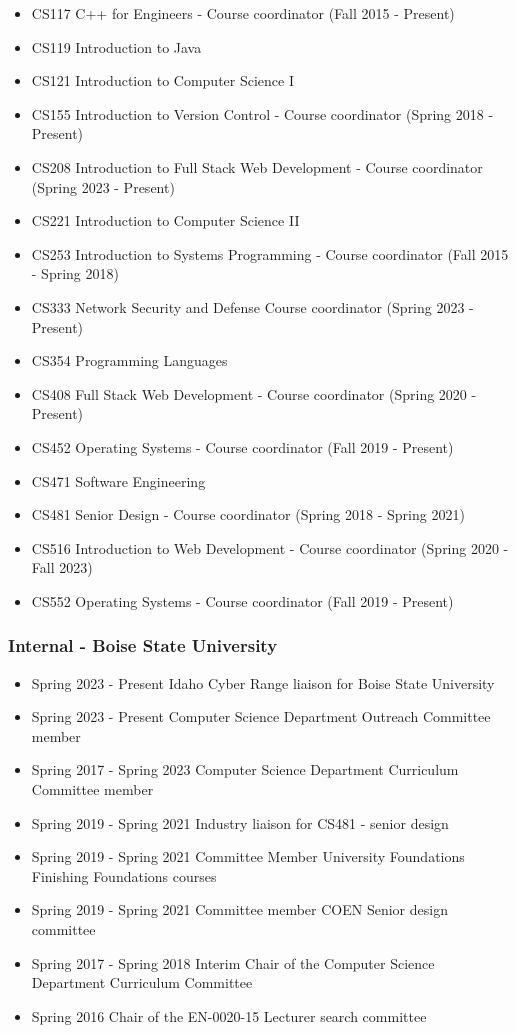 \documentclass{shanep}
\begin{document}
\begin{itemize}
  \item CS117 C++ for Engineers - Course coordinator (Fall 2015 - Present)
  \item CS119 Introduction to Java
  \item CS121 Introduction to Computer Science I
  \item CS155 Introduction to Version Control - Course coordinator (Spring 2018 - Present)
  \item CS208 Introduction to Full Stack Web Development - Course coordinator (Spring 2023 - Present)
  \item CS221 Introduction to Computer Science II
  \item CS253 Introduction to Systems Programming - Course coordinator (Fall 2015 - Spring 2018)
  \item CS333 Network Security and Defense Course coordinator (Spring 2023 - Present)
  \item CS354 Programming Languages
  \item CS408 Full Stack Web Development - Course coordinator (Spring 2020 - Present)
  \item CS452 Operating Systems - Course coordinator (Fall 2019 - Present)
  \item CS471 Software Engineering
  \item CS481 Senior Design - Course coordinator (Spring 2018 - Spring 2021)
  \item CS516 Introduction to Web Development - Course coordinator (Spring 2020 - Fall 2023)
  \item CS552 Operating Systems - Course coordinator (Fall 2019 - Present)
\end{itemize}


\subsubsection*{Internal - Boise State University}
\begin{itemize}
  \item Spring 2023 - Present Idaho Cyber Range liaison for Boise State University
  \item Spring 2023 - Present Computer Science Department Outreach Committee member
  \item Spring 2017 - Spring 2023 Computer Science Department Curriculum Committee member
  \item Spring 2019 - Spring 2021 Industry liaison for CS481 - senior design
  \item Spring 2019 - Spring 2021 Committee Member University Foundations Finishing Foundations courses
  \item Spring 2019 - Spring 2021 Committee member COEN Senior design committee
  \item Spring 2017 - Spring 2018 Interim Chair of the Computer Science Department Curriculum Committee
  \item Spring 2016 Chair of the EN-0020-15 Lecturer search committee
\end{itemize}
\end{document}
